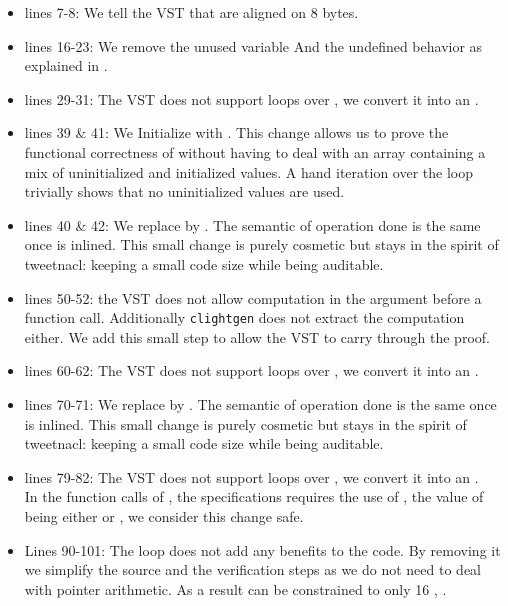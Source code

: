 \begin{itemize}
  \item lines 7-8: We tell the VST that  are
  aligned on 8 bytes.

  \item lines 16-23: We remove the unused variable  And the undefined behavior as explained in .

  \item lines 29-31: The VST does not support  loops over , we convert it into an .

  \item lines 39 \& 41: We Initialize  with .
  This change allows us to prove the functional correctness of  without having to deal with an array containing
  a mix of uninitialized and initialized values.
  A hand iteration over the loop trivially shows that no uninitialized values are used.

  \item lines 40 \& 42: We replace  by . The semantic of operation done is the same once  is inlined. This small change is purely cosmetic but stays in the spirit of tweetnacl: keeping a small code size while being auditable.

  \item lines 50-52: the VST does not allow computation in the argument before a function call. Additionally \texttt{clightgen} does not extract the computation either. We add this small step to allow the VST to carry through the proof.

  \item lines 60-62: The VST does not support  loops over , we convert it into an .

  \item lines 70-71: We replace  by . The semantic of operation done is the same once  is inlined. This small change is purely cosmetic but stays in the spirit of tweetnacl: keeping a small code size while being auditable.

  \item lines 79-82: The VST does not support  loops over , we convert it into an .\\
  In the function calls of , the specifications requires the use of , the value of  being either  or , we consider this change safe.

  \item Lines 90-101: The  loop does not add any benefits to the code. By removing it we simplify the source and the verification steps as we do not need to deal with pointer arithmetic. As a result  can be constrained to only 16 , \ie {}.

\end{itemize}
